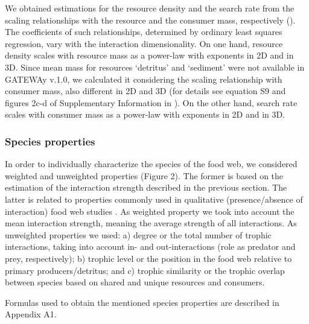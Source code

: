 \documentclass[gc, manuscript]{copernicus}
\begin{document}
We obtained estimations for the resource density and the search rate
from the scaling relationships with the resource and the consumer mass,
respectively (\citet{Pawar2012}). The coefficients of such
relationships, determined by ordinary least squares regression, vary
with the interaction dimensionality. On one hand, resource density
scales with resource mass as a power-law with exponents
 in 2D and  in 3D. Since
mean mass for resources `detritus' and `sediment' were not available in
GATEWAy v.1.0, we calculated it considering the scaling relationship
with consumer mass, also different in 2D and 3D (for details see
equation S9 and figures 2c-d of Supplementary Information in
\citet{Pawar2012}). On the other hand, search rate scales with consumer
mass as a power-law with exponents  in 2D and
 in 3D.

\subsubsection{Species properties}

In order to individually characterize the species of the food web, we
considered weighted and unweighted properties (Figure 2). The former is
based on the estimation of the interaction strength described in the
previous section. The latter is related to properties commonly used in
qualitative (presence/absence of interaction) food web studies
\citep{Martinez1991, Dunne2002, Borrelli2014}. As weighted property we
took into account the mean interaction strength, meaning the average
strength of all interactions. As unweighted properties we used: a)
degree or the total number of trophic interactions, taking into account
in- and out-interactions (role as predator and prey, respectively); b)
trophic level or the position in the food web relative to primary
producers/detritus; and c) trophic similarity or the trophic overlap
between species based on shared and unique resources and consumers.

Formulas used to obtain the mentioned species properties are described
in Appendix A1.
\end{document}
